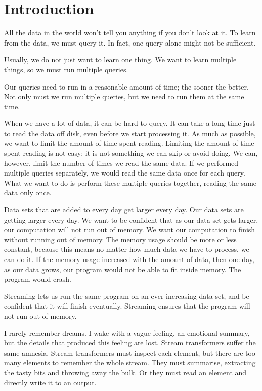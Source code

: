 \chapter{Introduction}
\label{chapter:introduction}

All the data in the world won't tell you anything if you don't look at it.
To learn from the data, we must query it.
In fact, one query alone might not be sufficient.

Usually, we do not just want to learn one thing.
We want to learn multiple things, so we must run multiple queries.

Our queries need to run in a reasonable amount of time; the sooner the better.
Not only must we run multiple queries, but we need to run them at the same time.

When we have a lot of data, it can be hard to query.
It can take a long time just to read the data off disk, even before we start processing it.
As much as possible, we want to limit the amount of time spent reading.
Limiting the amount of time spent reading is not easy; it is not something we can skip or avoid doing.
We can, however, limit the number of times we read the same data.
If we performed multiple queries separately, we would read the same data once for each query.
What we want to do is perform these multiple queries together, reading the same data only once.

Data sets that are added to every day get larger every day.
Our data sets are getting larger every day.
We want to be confident that as our data set gets larger, our computation will not run out of memory.
We want our computation to finish without running out of memory.
The memory usage should be more or less constant, because this means no matter how much data we have to process, we can do it.
If the memory usage increased with the amount of data, then one day, as our data grows, our program would not be able to fit inside memory.
The program would crash.

Streaming lets us run the same program on an ever-increasing data set, and be confident that it will finish eventually.
Streaming ensures that the program will not run out of memory.


I rarely remember dreams.
I wake with a vague feeling, an emotional summary, but the details that produced this feeling are lost.
Stream transformers suffer the same amnesia.
Stream transformers must inspect each element, but there are too many elements to remember the whole stream.
They must summarise, extracting the tasty bits and throwing away the bulk.
Or they must read an element and directly write it to an output.

